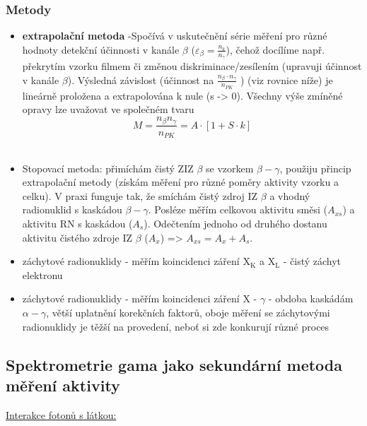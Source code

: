 \subsubsection{Metody}
\begin{itemize}
    \item \textbf{extrapolační metoda} -Spočívá v uskutečnění série měření pro různé hodnoty detekční účinnosti v kanále $\beta$ ($\varepsilon_\beta = \frac{n_k}{n_\gamma}$), čehož docílíme např. překrytím vzorku filmem či změnou diskriminace/zesílením (upravuji účinnost v kanále $\beta$). Výsledná závislost (účinnost na $\frac{n_\beta \cdot n_\gamma}{n_{PK}}$ ) (viz rovnice níže) je lineárně proložena a extrapolována k nule (s -> 0). Všechny výše zmíněné opravy lze uvažovat ve společném tvaru $$M = \dfrac{n_{\beta} n_{\gamma}}{n_{PK}} = A \cdot [1 + S\cdot k] $$ \\
   \item Stopovací metoda: přimíchám čistý ZIZ $\beta$ se vzorkem $\beta-\gamma$, použiju přincip extrapolační metody (získám měření pro různé poměry aktivity vzorku a celku). V praxi funguje tak, že smíchám čistý zdroj IZ $\beta$ a vhodný radionuklid s kaskádou $\beta - \gamma$. Posléze měřím celkovou aktivitu směsi ($A_{xs}$) a aktivitu RN s kaskádou ($A_s$). Odečtením jednoho od druhého dostanu aktivitu čistého zdroje IZ $\beta$ ($A_x$) => $A_{xs} = A_x + A_s$.
    \item záchytové radionuklidy - měřím koincidenci záření X$_{\text{K}}$ a X$_{\text{L}}$ - čistý záchyt elektronu
    \item záchytové radionuklidy - měřím koincidenci záření X - $\gamma$ - obdoba kaskádám $\alpha - \gamma$, větší uplatnění korekčních faktorů, oboje měření se záchytovými radionuklidy je těžší na provedení, neboť si zde konkurují různé proces
    
    \end{itemize}

\subsection{Spektrometrie gama jako sekundární metoda měření aktivity}

\underline{Interakce fotonů s látkou:}

